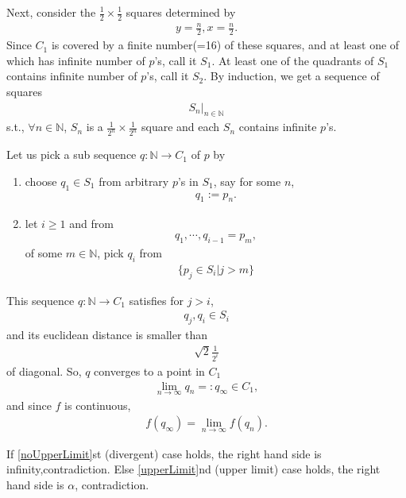 \documentclass[11pt]{book}
\begin{document}
Next, consider the $\frac{1}{2} \times \frac{1}{2}$ squares determined by
\begin{eqnarray}
y = \frac{n}{2}, x = \frac{n}{2}.
\end{eqnarray}
Since $C_1$ is covered by a finite number(=16) of these squares, and at least one of which has infinite number of $p$'s, call it $S_1$.
At least one of the quadrants of $S_1$ contains infinite number of $p$'s, call it $S_2$.
By induction, we get a sequence of squares
\begin{eqnarray}
\left. S_n \right|_{n \in \mathbb{N}}
\end{eqnarray}
s.t., $\forall n \in \mathbb{N}$, $S_n$ is a $\frac{1}{2^n} \times \frac{1}{2^n}$ square and each $S_n$ contains infinite $p$'s.

Let us pick a sub sequence $q : \mathbb{N} \to C_1$ of $p$ by
\begin{enumerate}
\item choose $q_1 \in S_1$ from arbitrary $p$'s in $S_1$, say for some $n$,
\begin{eqnarray}
q_1 := p_n.
\end{eqnarray}

\item let $i \geq 1$ and from
\begin{eqnarray}
q_1, \cdots, q_{i-1} = p_{m},
\end{eqnarray}
of some $m \in \mathbb{N}$, pick $q_i$ from
\begin{eqnarray}
\{p_j  \in S_i | j > m  \}
\end{eqnarray}

\end{enumerate}

This sequence $q : \mathbb{N} \to C_1$ satisfies for $j>i$,
\begin{eqnarray}
q_j, q_i \in S_i
\end{eqnarray}
and its euclidean distance is smaller than 
\begin{eqnarray}
\sqrt{2} \frac{1}{2^i}
\end{eqnarray}
of diagonal.
So, $q$ converges to a point in $C_1$
\begin{eqnarray}
\lim_{n\to \infty} q_n =: q_\infty \in C_1,
\end{eqnarray}
and since $f$ is continuous,
\begin{eqnarray}
f(q_\infty) = \lim_{n\to \infty} f(q_n).
\end{eqnarray}

If \ref{noUpperLimit}st (divergent) case holds, the right hand side is infinity,contradiction.
Else \ref{upperLimit}nd (upper limit) case holds, the right hand side is $\alpha$, contradiction.
\end{document}
